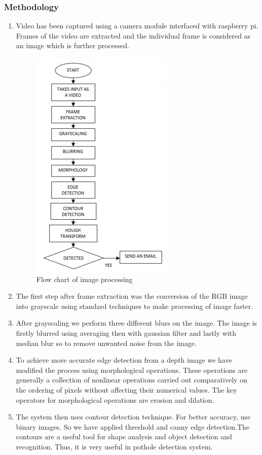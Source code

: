 \documentclass[12pt]{report}
\begin{document}
\subsubsection{Methodology}
\begin{enumerate}[topsep=0pt]

\item Video has been captured using a camera module interfaced with raspberry pi. Frames of the video are extracted and the individual frame is considered as an image which is further processed.

\begin{figure}[H]\includegraphics[scale=0.9]{flowchart.png}\centering\caption{Flow chart of image processing\cite{A}} \label{fig:Flow chart of image processing} \end{figure}%

\item The first step after frame extraction was the conversion of the RGB image into grayscale using standard techniques to make processing of image faster.

\item After grayscaling we perform three different blurs on the image. The image is firstly blurred using averaging then with gaussian filter and lastly with median blur so to remove unwanted noise from the image.

\item To achieve more accurate edge detection from a depth image we have modified the process using morphological operations. These operations are generally a collection of nonlinear operations carried out comparatively on the ordering of pixels without affecting their numerical values. The key operators for morphological operations are erosion and dilation\cite{A}.

\item The system then uses contour detection technique. For better accuracy, use binary images. So we have applied threshold and canny edge detection.The contours are a useful tool for shape analysis and object detection and recognition. Thus, it is very useful in pothole detection system.

\end{enumerate}
\end{document}
